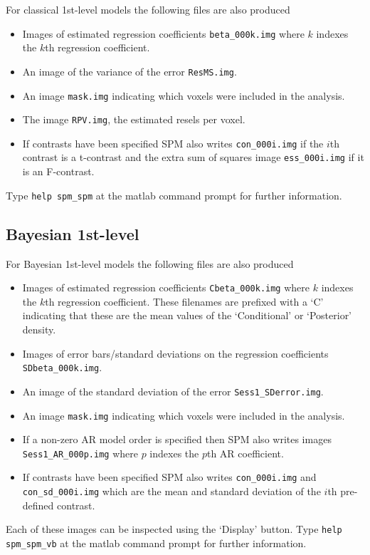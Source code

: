 For classical 1st-level models the following 
files are also produced
\begin{itemize}
\item{Images of estimated regression coefficients  \verb!beta_000k.img! where $k$ indexes the $k$th regression coefficient.}
\item{An image of the variance of the 
error \verb!ResMS.img!.}
\item{An image \verb!mask.img! indicating which voxels 
were included in the analysis.}
\item{The image \verb!RPV.img!, the estimated resels per voxel.}
\item{If contrasts have been specified SPM also writes \verb!con_000i.img!  if the $i$th contrast is a t-contrast and the extra sum of squares image \verb!ess_000i.img! if it is an F-contrast.} 
\end{itemize}
Type \verb!help spm_spm! at the matlab command prompt for further information.

\subsection{Bayesian 1st-level}
For Bayesian 1st-level models the following 
files are also produced
\begin{itemize}
\item{Images of estimated regression coefficients  \verb!Cbeta_000k.img! where $k$ indexes the $k$th regression coefficient. These filenames are prefixed with a `C' indicating that these
are the mean values of the `Conditional' or `Posterior' density.}
\item{Images of error bars/standard deviations on the regression coefficients \verb!SDbeta_000k.img!.}
\item{An image of the standard deviation of the 
error \verb!Sess1_SDerror.img!.}
\item{An image \verb!mask.img! indicating which voxels 
were included in the analysis.}
\item{If a non-zero AR model order is specified then 
SPM also writes images \verb!Sess1_AR_000p.img! where $p$ indexes the $p$th AR coefficient.}
\item{If contrasts have been specified SPM also writes \verb!con_000i.img! and \verb!con_sd_000i.img! which are the mean and standard deviation of the $i$th pre-defined contrast.} 
\end{itemize}
Each of these images can be inspected using the `Display' button. Type \verb!help spm_spm_vb! at the matlab command prompt for further information.


